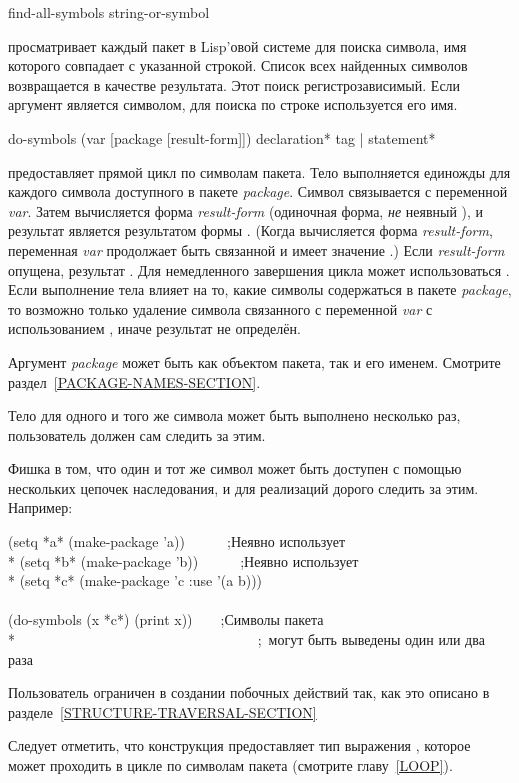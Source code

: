 \begin{defun}[Функция]
find-all-symbols string-or-symbol

 просматривает каждый пакет в Lisp'овой системе для поиска
символа, имя которого совпадает с указанной строкой. Список всех найденных
символов возвращается в качестве результата.
Этот поиск регистрозависимый.
Если аргумент является символом, для поиска по строке используется его
имя.
\end{defun}

\begin{defmac}
do-symbols (var [package [result-form]])
           {declaration}* {tag | statement}*

 предоставляет прямой цикл по символам пакета. Тело выполняется
единожды для каждого символа доступного в пакете \emph{package}. Символ
связывается с переменной \emph{var}.
Затем вычисляется форма \emph{result-form} (одиночная форма, \emph{не} неявный
), и результат является результатом формы . (Когда
вычисляется форма \emph{result-form}, переменная \emph{var} продолжает быть
связанной и имеет значение {\false}.) Если \emph{result-form} опущена, результат
{\false}. Для немедленного завершения цикла может использоваться
. Если выполнение тела влияет на то, какие символы содержаться в
пакете \emph{package}, то возможно только удаление символа связанного с
переменной \emph{var} с использованием , иначе результат
не определён.

Аргумент \emph{package} может быть как объектом пакета, так и его
именем. Смотрите раздел~\ref{PACKAGE-NAMES-SECTION}.

\begin{new}
Тело  для одного и того же символа может быть
выполнено несколько раз, пользователь должен сам следить за этим.

Фишка в том, что один и тот же символ может быть доступен с помощью
нескольких цепочек наследования, и для реализаций дорого следить за
этим. Например:
\begin{lisp}
(setq *a* (make-package 'a))~~~~~~;\textrm{Неявно использует } \\*
(setq *b* (make-package 'b))~~~~~~;\textrm{Неявно использует } \\*
(setq *c* (make-package 'c :use '(a b))) \\
\\
(do-symbols (x *c*) (print x))~~~~;\textrm{Символы пакета } \\*
~~~~~~~~~~~~~~~~~~~~~~~~~~~~~~~~~~;~\textrm{могут быть выведены один или два раза}
\end{lisp}

\end{new}

Пользователь ограничен в создании побочных действий так, как это описано в
разделе~\ref{STRUCTURE-TRAVERSAL-SECTION}

Следует отметить, что конструкция  предоставляет тип выражения
, которое может проходить в цикле по символам пакета (смотрите главу~\ref{LOOP}).
\end{defmac}

